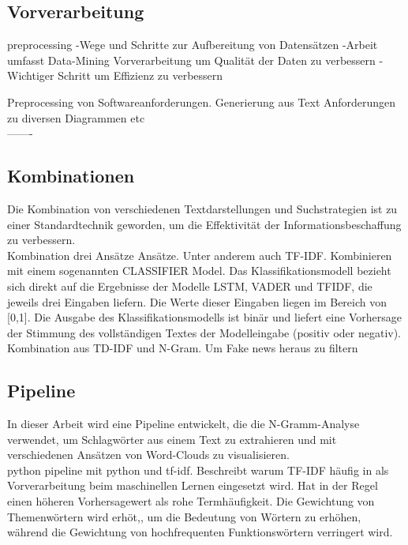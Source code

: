 \subsection{Vorverarbeitung}

preprocessing
\cite{alasadi2017review}
-Wege und Schritte zur Aufbereitung von Datensätzen
-Arbeit umfasst Data-Mining Vorverarbeitung um Qualität der Daten zu verbessern
-Wichtiger Schritt um Effizienz zu verbessern

Preprocessing von Softwareanforderungen. Generierung aus Text Anforderungen zu diversen Diagrammen etc \cite{kroha2000preprocessing}\\

-------

\subsection{Kombinationen}
Die Kombination von verschiedenen Textdarstellungen und Suchstrategien ist zu einer Standardtechnik geworden, um die Effektivität der Informationsbeschaffung zu verbessern.\cite{croft2000combining}\\

Kombination drei Ansätze Ansätze. Unter anderem auch TF-IDF. Kombinieren mit einem sogenannten CLASSIFIER Model. Das Klassifikationsmodell bezieht sich direkt auf die
Ergebnisse der Modelle LSTM, VADER und TFIDF, die jeweils drei Eingaben liefern. Die Werte dieser Eingaben liegen im
Bereich von [0,1].
Die Ausgabe des Klassifikationsmodells ist binär und liefert eine Vorhersage der
Stimmung des vollständigen Textes der Modelleingabe (positiv oder negativ).\cite{chiny2021lstm}\\

Kombination aus TD-IDF und N-Gram. Um Fake news heraus zu filtern\cite{suhasini2021hybrid}

\subsection{Pipeline}
In dieser Arbeit wird eine Pipeline entwickelt, die die N-Gramm-Analyse verwendet, um Schlagwörter aus einem Text zu extrahieren und mit verschiedenen Ansätzen von Word-Clouds zu visualisieren.\cite{pirk2019implementierung}\\

python pipeline mit python und tf-idf. Beschreibt warum TF-IDF häufig in  als Vorverarbeitung beim maschinellen Lernen eingesetzt wird. Hat in der Regel einen höheren Vorhersagewert als rohe Termhäufigkeit. Die Gewichtung von Themenwörtern wird erhöt,, um die Bedeutung von Wörtern zu erhöhen, während die Gewichtung von hochfrequenten Funktionswörtern verringert wird.\cite{lavin2019analyzing}\\

